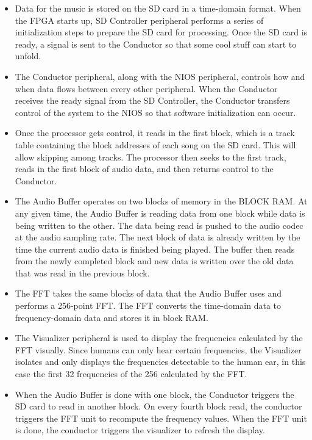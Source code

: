 \documentclass{article}
\begin{document}
\begin{itemize}
	\item Data for the music is stored on the SD card in a time-domain format.
		When the FPGA starts up, SD Controller peripheral performs a series of
		initialization steps to prepare the SD card for processing. Once the 
		SD card is ready, a signal is sent to the Conductor so that some cool 
		stuff can start to unfold.  
	\item The Conductor peripheral, along with the NIOS peripheral,
		controls how and when data flows between every other peripheral. 
		When the Conductor receives the ready signal from the SD Controller, 
		the Conductor transfers control of the system to the NIOS so that 
		software initialization can occur.  
	\item Once the processor gets control, it reads in the first block, which
		is a track table containing the block addresses of each song on the SD
		card. This will allow skipping among tracks. The processor then
		seeks to the first track, reads in the first block of audio data, and
		then returns control to the Conductor.
	\item The Audio Buffer operates on two blocks of memory in the BLOCK RAM.
		At any given time, the Audio Buffer is reading data from one block
		while data is being written to the other. The data being read is
		pushed to the audio codec at the audio sampling rate. 
		The next block of data is already written by the time the current audio 
		data is finished being played. The buffer then reads from the newly 
		completed block and new data is written over the old data that was 
		read in the previous block.
	\item The FFT takes the same blocks of data that the Audio Buffer uses
		and performs a 256-point FFT. The FFT converts the time-domain data
		to frequency-domain data and stores it in block RAM.  
	\item The Visualizer peripheral is used to display the frequencies
		calculated by the FFT visually. Since humans can only hear
		certain frequencies, the Visualizer isolates and only displays
		the frequencies detectable to the human ear, in this case the
		first 32 frequencies of the 256 calculated by the FFT.  
	\item When the Audio Buffer is done with one block, the Conductor triggers
		the SD card to read in another block. On every fourth block read, the
		conductor triggers the FFT unit to recompute the frequency values.
		When the FFT unit is done, the conductor triggers the visualizer to
		refresh the display.
\end{itemize}
\newpage
\end{document}
